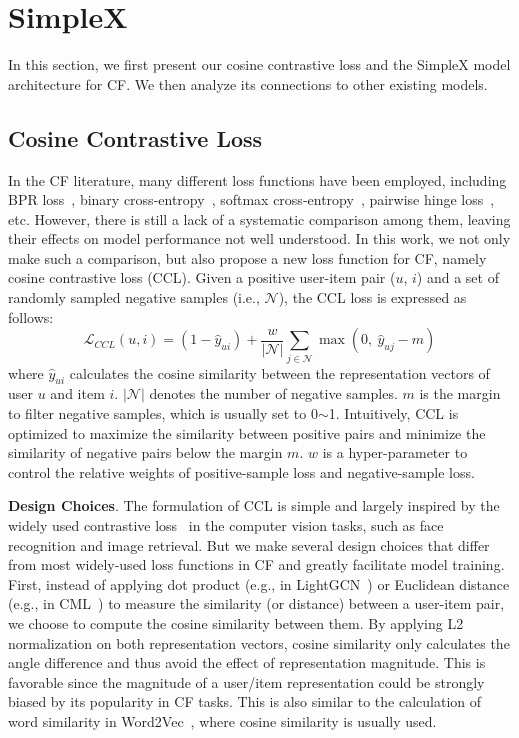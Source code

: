 \documentclass[sigconf,authorversion]{acmart}
\begin{document}
    




 \section{SimpleX}\label{sec:approach}
In this section, we first present our cosine contrastive loss and the SimpleX model architecture for CF. We then analyze its connections to other existing models.

\subsection{Cosine Contrastive Loss}
\label{approach:MF-CCL}

In the CF literature, many different loss functions have been employed, including BPR loss~\cite{BPR}, binary cross-entropy~\cite{NeuMF}, softmax cross-entropy~\cite{YouTubeNet}, pairwise hinge loss~\cite{CML}, etc. However, there is still a lack of a systematic comparison among them, leaving their effects on model performance not well understood. In this work, we not only make such a comparison, but also propose a new loss function for CF, namely cosine contrastive loss (CCL). Given a positive user-item pair ($u$, $i$) and a set of randomly sampled negative samples (i.e., $\mathcal{N}$), the CCL loss is expressed as follows:
\begin{equation}\label{equ:ccl}
    \mathcal{L}_{CCL}(u,i) = (1 - \hat{y}_{ui})+ \frac{w}{|\mathcal{N}|} \sum_{j \in \mathcal{N}}\operatorname{max}(0, \: \hat{y}_{uj} - m)
\end{equation}
where $\hat{y}_{ui}$ calculates the cosine similarity between the representation vectors of user $u$ and item $i$. $|\mathcal{N}|$ denotes the number of negative samples. $m$ is the margin to filter negative samples, which is usually set to 0$\sim$1. Intuitively, CCL is optimized to maximize the similarity between positive pairs and minimize the similarity of negative pairs below the margin $m$. $w$ is a hyper-parameter to control the relative weights of positive-sample loss and negative-sample loss. 

\textbf{Design Choices}. 
The formulation of CCL is simple and largely inspired by the widely used contrastive loss~\cite{ContrastiveLoss1,ContrastiveLoss2} in the computer vision tasks, such as face recognition and image retrieval. But we make several design choices that differ from most widely-used loss functions in CF and greatly facilitate model training. First, instead of applying dot product (e.g., in LightGCN~\cite{LightGCN}) or Euclidean distance (e.g., in CML~\cite{CML}) to measure the similarity (or distance) between a user-item pair, we choose to compute the cosine similarity between them. By applying L2 normalization on both representation vectors, cosine similarity only calculates the angle difference and thus 
avoid the effect of representation magnitude. This is favorable since the magnitude of a user/item representation could be strongly biased by its popularity in CF tasks. This is also similar to the calculation of word similarity in Word2Vec~\cite{word2vec}, where cosine similarity is usually used.
\end{document}
